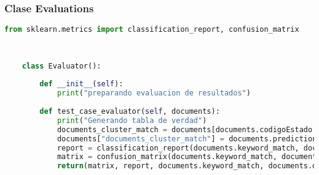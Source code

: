 \documentclass[12pt]{article}
\begin{document}
	
	\subsubsection*{ Clase Evaluations}
	\begin{lstlisting}[language=Python, caption = Clase Evaluations]
	from sklearn.metrics import classification_report, confusion_matrix
	
	
	
	class Evaluator():
	    
	    def __init__(self):
	        print("preparando evaluacion de resultados")
	        
	    def test_case_evaluator(self, documents):
	        print("Generando tabla de verdad")
	        documents_cluster_match = documents[documents.codigoEstado == "custom"].prediction.item()
	        documents["documents_cluster_match"] = documents.prediction == documents_cluster_match
	        report = classification_report(documents.keyword_match, documents.documents_cluster_match)
	        matrix = confusion_matrix(documents.keyword_match, documents.documents_cluster_match)
	        return(matrix, report, documents.keyword_match, documents.documents_cluster_match)
	
	\end{lstlisting}
	
	
\end{document}
